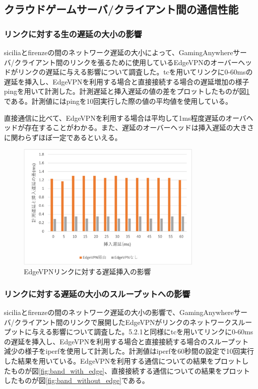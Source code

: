 \subsection{クラウドゲームサーバ/クライアント間の通信性能}

\subsubsection{リンクに対する生の遅延の大小の影響}
siciliaとfirenzeの間のネットワーク遅延の大小によって、GamingAnywhereサーバ/クライアント間のリンクを張るために使用しているEdgeVPNのオーバーヘッドがリンクの遅延に与える影響について調査した。tc\cite{iproute2}を用いてリンクに0-60msの遅延を挿入し、EdgeVPNを利用する場合と直接接続する場合の遅延増加の様子ping\cite{ping}を用いて計測した。計測遅延と挿入遅延の値の差をプロットしたものが図\ref{fig:ratency}である。計測値にはpingを10回実行した際の値の平均値を使用している。

直接通信に比べて、EdgeVPNを利用する場合は平均して1ms程度遅延のオーバヘッドが存在することがわかる。また、遅延のオーバーヘッドは挿入遅延の大きさに関わらずほぼ一定であるといえる。

\begin{figure}[t]
    \centering
    \includegraphics[width=0.8\textwidth,keepaspectratio,clip]{img/graph_ratency.pdf}
    \caption{EdgeVPNリンクに対する遅延挿入の影響}
    \label{fig:ratency}
\end{figure}

\subsubsection{リンクに対する遅延の大小のスループットへの影響}
siciliaとfirenzeの間のネットワーク遅延の大小の影響で、GamingAnywhereサーバ/クライアント間のリンクで展開したEdgeVPNがリンクのネットワークスループットに与える影響について調査した。5.2.1と同様にtcを用いてリンクに0-60msの遅延を挿入し、EdgeVPNを利用する場合と直接接続する場合のスループット減少の様子をiperf\cite{iperf}を使用して計測した。計測値はiperfを60秒間の設定で10回実行した結果を用いている。EdgeVPNを利用する通信についての結果をプロットしたものが図\ref{fig:band_with_edge}、直接接続する通信についての結果をプロットしたものが図\ref{fig:band_without_edge}である。

